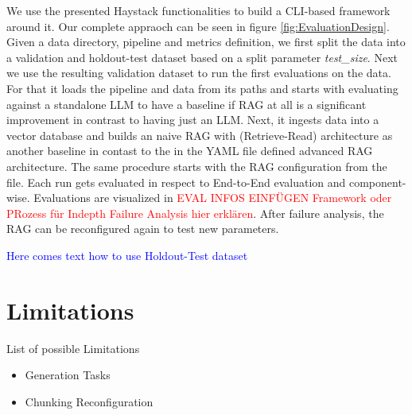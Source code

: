 We use the presented Haystack functionalities to build a CLI-based framework around it. Our complete appraoch can be seen in figure \ref{fig:EvaluationDesign}. Given a data directory, pipeline and metrics definition, we first split the data into a validation and holdout-test dataset based on a split parameter \textit{test\_size}. Next we use the resulting validation dataset to run the first evaluations on the data. For that it loads the pipeline and data from its paths and starts with evaluating against a standalone LLM to have a baseline if RAG at all is a significant improvement in contrast to having just an LLM. Next, it ingests data into a vector database and builds an naive RAG with (Retrieve-Read) architecture as another baseline in contast to the in the YAML file defined advanced RAG architecture. The same procedure starts with the RAG configuration from the file. Each run gets evaluated in respect to End-to-End evaluation and component-wise. Evaluations are visualized in \textcolor{red}{EVAL INFOS EINFÜGEN Framework oder PRozess für Indepth Failure Analysis hier erklären}. After failure analysis, the RAG can be reconfigured again to test new parameters. 

\textcolor{blue}{Here comes text how to use Holdout-Test dataset}



\section{Limitations}

List of possible Limitations

\begin{itemize}
    \item Generation Tasks 
    \item Chunking Reconfiguration
\end{itemize}